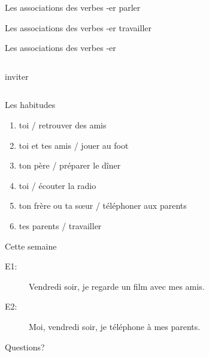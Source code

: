 \documentclass{beamer}
\begin{document}
  \begin{frame}{Les associations des verbes -er}
    \centering
    parler

  \end{frame}

  \begin{frame}{Les associations des verbes -er}
    \centering
    travailler

  \end{frame}

  \begin{frame}{Les associations des verbes -er}
    \begin{columns}
        \begin{center}
          inviter
        \end{center}
        \begin{center}
        \end{center}
    \end{columns}
  \end{frame}

  \begin{frame}{Les habitudes}
    \begin{enumerate}
      \item toi / retrouver des amis
      \item toi et tes amis / jouer au foot
      \item ton père / préparer le dîner
      \item toi / écouter la radio
      \item ton frère ou ta sœur / téléphoner aux parents
      \item tes parents / travailler
    \end{enumerate}
  \end{frame}

  \begin{frame}{Cette semaine}
    \begin{description}
      \item[E1:] Vendredi soir, je regarde un film avec mes amis.
      \item[E2:] Moi, vendredi soir, je téléphone à mes parents.
    \end{description}

  \end{frame}

  \begin{frame}{}
    \begin{center}
      \Large Questions?
    \end{center}
  \end{frame}
\end{document}
